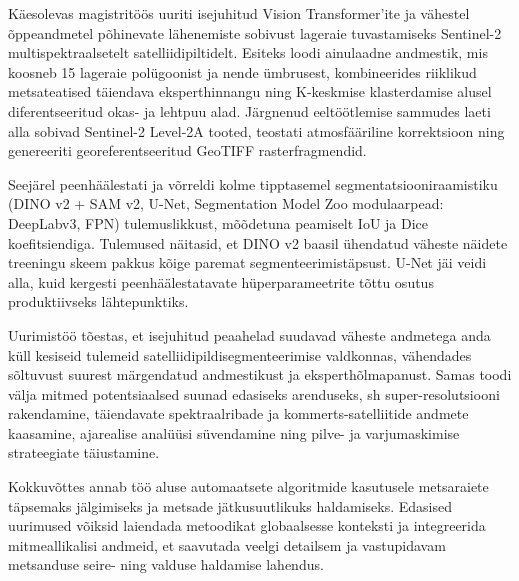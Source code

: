 Käesolevas magistritöös uuriti isejuhitud Vision Transformer'ite ja vähestel
õppeandmetel põhinevate lähenemiste sobivust lageraie tuvastamiseks Sentinel-2
multispektraalsetelt satelliidipiltidelt. Esiteks loodi ainulaadne andmestik,
mis koosneb 15 lageraie polügoonist ja nende ümbrusest, kombineerides riiklikud
metsateatised täiendava eksperthinnangu ning K-keskmise klasterdamise alusel
diferentseeritud okas- ja lehtpuu alad. Järgnenud eeltöötlemise sammudes laeti
alla sobivad Sentinel-2 Level-2A tooted, teostati atmosfääriline korrektsioon
ning genereeriti georeferentseeritud GeoTIFF rasterfragmendid.

Seejärel peenhäälestati ja võrreldi kolme tipptasemel segmentatsiooniraamistiku
(DINO v2 + SAM v2, U-Net, Segmentation Model Zoo modulaarpead: DeepLabv3, FPN)
tulemuslikkust, mõõdetuna peamiselt IoU ja Dice koefitsiendiga. Tulemused
näitasid, et DINO v2 baasil ühendatud väheste näidete treeningu skeem
pakkus kõige paremat segmenteerimistäpsust. U-Net jäi veidi alla, kuid
kergesti peenhäälestatavate hüperparameetrite tõttu osutus produktiivseks
lähtepunktiks.

Uurimistöö tõestas, et isejuhitud peaahelad suudavad väheste andmetega anda
küll kesiseid tulemeid satelliidipildisegmenteerimise valdkonnas,
vähendades sõltuvust suurest märgendatud andmestikust ja eksperthõlmapanust.
Samas toodi välja mitmed potentsiaalsed suunad edasiseks arenduseks, sh
super-resolutsiooni rakendamine, täiendavate spektraalribade ja
kommerts-satelliitide andmete kaasamine, ajarealise analüüsi süvendamine ning
pilve- ja varjumaskimise strateegiate täiustamine.

Kokkuvõttes annab töö aluse automaatsete algoritmide kasutusele metsaraiete
täpsemaks jälgimiseks ja metsade jätkusuutlikuks haldamiseks. Edasised uurimused
võiksid laiendada metoodikat globaalsesse konteksti ja integreerida
mitmeallikalisi andmeid, et saavutada veelgi detailsem ja vastupidavam
metsanduse seire- ning valduse haldamise lahendus.
